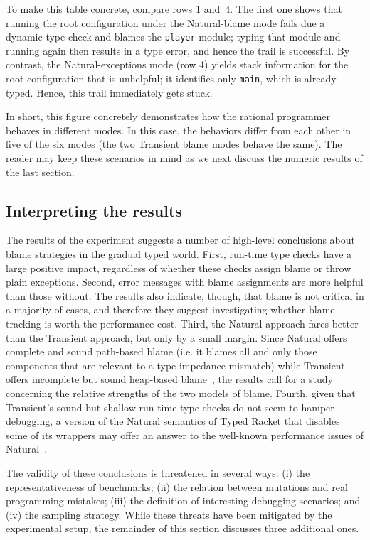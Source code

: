To make this table concrete, compare rows 1 and~4. The first one shows that
running the root configuration under the Natural-blame mode fails due a dynamic
type check and blames the {\tt player} module; typing that module and running
again then results in a type error, and hence the trail is successful.  By
contrast, the Natural-exceptions mode (row 4) yields stack information for the
root configuration that is unhelpful; it identifies only {\tt main}, which is
already typed. Hence, this trail immediately gets stuck.

In short, this figure concretely demonstrates how the rational programmer
behaves in different modes. In this case, the behaviors differ from each other
in five of the six modes (the two Transient blame modes behave the same).
The reader may keep these scenarios in mind as we next
discuss the numeric results of the last section.

\subsection{Interpreting the results}

The results of the experiment suggests a number of high-level conclusions about
blame strategies in the gradual typed world.  First, run-time type checks have a
large positive impact, regardless of whether these checks assign blame or throw
plain exceptions.  Second, error messages with blame assignments are more
helpful than those without. The results also indicate, though, that blame is not
critical in a majority of cases, and therefore they suggest investigating
whether blame tracking is worth the performance cost.  Third, the Natural
approach fares better than the Transient approach, but only by a small margin.
Since Natural offers complete and sound path-based blame (i.e. it blames all and only those components
that are relevant to a type impedance mismatch) while Transient offers
incomplete but sound heap-based blame~\citep{gfd-oopsla-2019}, the results call
for a study concerning the relative strengths of the two models of blame.
Fourth, given that Transient's sound but shallow run-time type checks do not
seem to hamper debugging, a version of the Natural semantics of Typed Racket
that disables some of its wrappers may offer an answer to the well-known
performance issues of Natural~\citep{gtnffvf-jfp-2019}.

The validity of these conclusions is threatened in several ways: (i) the
representativeness of benchmarks; (ii) the relation between mutations and real
programming mistakes; (iii) the definition of interesting debugging scenarios;
and (iv) the sampling strategy. While these threats have been mitigated by the
experimental setup, the remainder of this section discusses three additional
ones.


